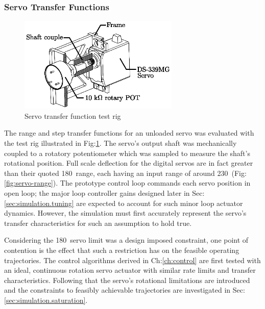 \subsubsection*{Servo Transfer Functions}
\begin{figure}[htbp]
\centering
\includegraphics[width=0.68\textwidth]{figs/servo-position}
\vspace{-6pt}
\caption{Servo transfer function test rig}
\label{fig:servo-position}
\end{figure}
The range and step transfer functions for an unloaded servo was evaluated with the test rig illustrated in Fig:\ref{fig:servo-position}. The servo's output shaft was mechanically coupled to a rotatory potentiometer which was sampled to measure the shaft's rotational position. Full scale deflection for the digital servos are in fact greater than their quoted 180\textdegree ~range, each having an input range of around 230\textdegree ~(Fig:\ref{fig:servo-range}). The prototype control loop commands each servo position in open loop; the major loop controller gains designed later in Sec:\ref{sec:simulation.tuning} are expected to account for such minor loop actuator dynamics. However, the simulation must first accurately represent the servo's transfer characteristics for such an assumption to hold true. 
\par
Considering the 180\textdegree ~servo limit was a design imposed constraint, one point of contention is the effect that such a restriction has on the feasible operating trajectories. The control algorithms derived in Ch:\ref{ch:control} are first tested with an ideal, continuous rotation servo actuator with similar rate limits and transfer characteristics. Following that the servo's rotational limitations are introduced and the constraints to feasibly achievable trajectories are investigated in Sec:\ref{sec:simulation.saturation}.
